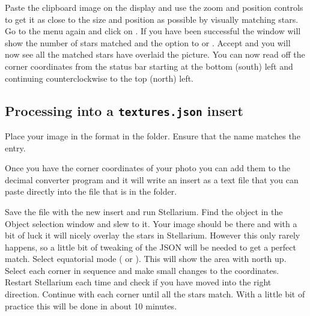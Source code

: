 Paste the clipboard image on the display and use the zoom and position
controls to get it as close to the size and position as possible by
visually matching stars. Go to the menu again and click on .
If you have been successful the window will show the number of stars
matched and the option to  or . Accept and you will now
see all the matched stars have overlaid the picture. You can now read
off the corner coordinates from the status bar starting at the bottom
(south) left and continuing counterclockwise to the top (north) left.

\subsection{Processing into a \texorpdfstring{\texttt{textures.json} insert}{textures.json insert}}%

Place your image in the  format in the
 folder. Ensure that the name matches the
 entry.

Once you have the corner coordinates of your photo you can add them to
the decimal converter program and it will write an insert
 as a text file that you can paste directly into the
 file that is in the 
folder.

Save the  file with the new insert and run
Stellarium. Find the object in the  Object selection window and slew to
it. Your image should be there and with a bit of luck it will nicely
overlay the stars in Stellarium. However this only rarely
happens, so a little bit of tweaking of the JSON  will be
needed to get a perfect match. Select equatorial mode ( or ).
This will show the area with north up. Select each corner in sequence
and make small changes to the coordinates. Restart Stellarium each time
and check if you have moved into the right direction. Continue with each
corner until all the stars match. With a little bit of practice this
will be done in about 10 minutes.



